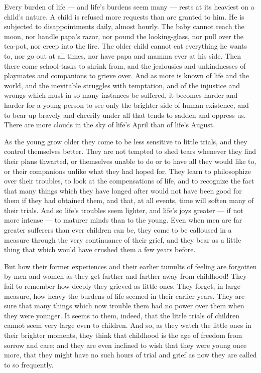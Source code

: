 \documentclass[
]{book}
\begin{document}
Every burden of life --- and life's burdens seem many --- rests at its heaviest on a child's nature. A child is refused more requests than are granted to him. He is subjected to disappointments daily, almost hourly. The baby cannot reach the moon, nor handle papa's razor, nor pound the looking-glass, nor pull over the tea-pot, nor creep into the fire. The older child cannot eat everything he wants to, nor go out at all times, nor have papa and mamma ever at his side. Then there come school-tasks to shrink from, and the jealousies and unkindnesses of playmates and companions to grieve over. And as more is known of life and the world, and the inevitable struggles with temptation, and of the injustice and wrongs which must in so many instances be suffered, it becomes harder and harder for a young person to see only the brighter side of human existence, and to bear up bravely and cheerily under all that tends to sadden and oppress us. There are more clouds in the sky of life's April than of life's August.

As the young grow older they come to be less sensitive to little trials, and they control themselves better. They are not tempted to shed tears whenever they find their plans thwarted, or themselves unable to do or to have all they would like to, or their companions unlike what they had hoped for. They learn to philosophize over their troubles, to look at the compensations of life, and to recognize the fact that many things which they have longed after would not have been good for them if they had obtained them, and that, at all events, time will soften many of their trials. And so life's troubles seem lighter, and life's joys greater --- if not more intense --- to maturer minds than to the young. Even when men are far greater sufferers than ever children can be, they come to be calloused in a measure through the very continuance of their grief, and they bear as a little thing that which would have crushed them a few years before.

But how their former experiences and their earlier tumults of feeling are forgotten by men and women as they get farther and farther away from childhood! They fail to remember how deeply they grieved as little ones. They forget, in large measure, how heavy the burdens of life seemed in their earlier years. They are sure that many things which now trouble them had no power over them when they were younger. It seems to them, indeed, that the little trials of children cannot seem very large even to children. And so, as they watch the little ones in their brighter moments, they think that childhood is the age of freedom from sorrow and care; and they are even inclined to wish that they were young once more, that they might have no such hours of trial and grief as now they are called to so frequently.
\end{document}
